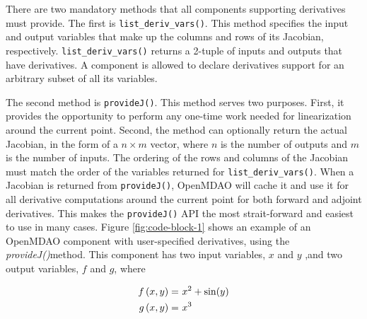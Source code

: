 \documentclass[]{aiaa-tc} %
\begin{document}
        There are two mandatory methods that all components supporting derivatives must provide.
        The first is \texttt{list\_deriv\_vars()}. This method specifies the
        input and output variables that make up the columns and rows of its Jacobian, respectively.
        \texttt{list\_deriv\_vars()} returns a 2-tuple of inputs and outputs that have derivatives.
        A component is allowed to declare derivatives support for an arbitrary subset of all its variables.

        The second method is \texttt{provideJ()}. This method serves two purposes. First, it provides the
        opportunity to perform any one-time work needed for linearization around the current point. Second,
        the method can optionally return the actual Jacobian, in the form of a $n \times m$ vector, where $n$ is the
        number of outputs and $m$ is the number of inputs. The ordering of the rows and columns of the Jacobian
        must match the order of the variables returned for \texttt{list\_deriv\_vars()}. When a Jacobian is
        returned from \texttt{provideJ()}, OpenMDAO will cache it and use it for all derivative computations
        around the current point for both forward and adjoint derivatives. This makes the \texttt{provideJ()}
        API the most strait-forward and easiest to use in many cases. Figure \ref{fig:code-block-1} shows
        an example of an OpenMDAO component with user-specified derivatives, using the \textit{provideJ()}method.
        This component has two input variables, $x$ and $y$ ,and two output variables, $f$ and $g$, where

        \begin{align}
            f\left(x, y\right) =&\  x^2 + \sin(y) \\ \notag
            g\left(x, y\right) =&\  x^3
        \end{align}
\end{document}
